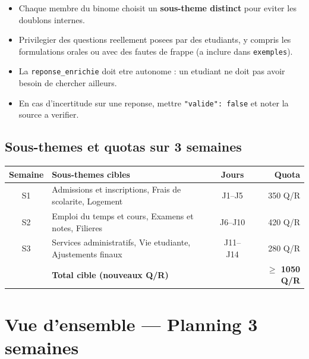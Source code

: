 \documentclass[11pt,a4paper]{article}
\begin{document}
\begin{astuce}
\begin{itemize}
    \item Chaque membre du binome choisit un \textbf{sous-theme distinct} pour eviter les doublons internes.
    \item Privilegier des questions reellement posees par des etudiants, y compris les formulations orales ou avec des fautes de frappe (a inclure dans \texttt{exemples}).
    \item La \texttt{reponse\_enrichie} doit etre autonome : un etudiant ne doit pas avoir besoin de chercher ailleurs.
    \item En cas d'incertitude sur une reponse, mettre \texttt{"valide": false} et noter la source a verifier.
\end{itemize}
\end{astuce}

\subsection{Sous-themes et quotas sur 3 semaines}

\begin{center}
\begin{tabular}{c l c r}
\toprule
Semaine & Sous-themes cibles & Jours & Quota \\
\midrule
S1 & Admissions et inscriptions, Frais de scolarite, Logement & J1--J5 & 350 Q/R \\
S2 & Emploi du temps et cours, Examens et notes, Filieres & J6--J10 & 420 Q/R \\
S3 & Services administratifs, Vie etudiante, Ajustements finaux & J11--J14 & 280 Q/R \\
\midrule
  & \textbf{Total cible (nouveaux Q/R)} & & \textbf{$\geq$ 1050 Q/R} \\
\bottomrule
\end{tabular}
\end{center}

\clearpage

\section{Vue d'ensemble --- Planning 3 semaines}
\end{document}
